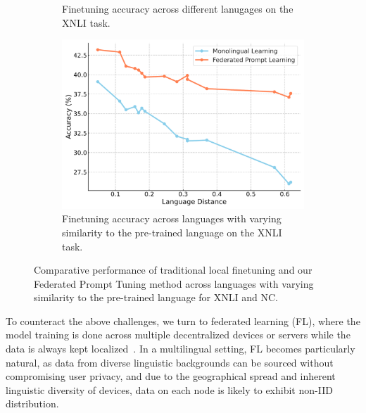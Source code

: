 \documentclass[withindex,glossary,firstyr]{cam-thesis}
\begin{document}
\begin{figure}[h]
\begin{subfigure}{0.49\textwidth}
        \vspace{-0.1cm}
        \caption{Finetuning accuracy across different lanugages on the XNLI task. }
    \end{subfigure}
    \hfill
    \begin{subfigure}{0.49\textwidth}
        \centering
        \includegraphics[width=0.8\linewidth]{xnli_distance.pdf}
        \vspace{-0.1cm}
        \caption{Finetuning accuracy across languages with varying similarity to the pre-trained language on the XNLI task. }
    \end{subfigure}
    \caption{Comparative performance of traditional local finetuning and our Federated Prompt Tuning method across languages with varying similarity to the pre-trained language for XNLI and NC. }
    \vspace{-0.5cm}%
    \label{fig:combined}
\end{figure}

To counteract the above challenges, we turn to federated learning (FL), where the model training is done across multiple decentralized devices or servers while the data is always kept localized~\cite{fedavg, fedprox, yang2019federated}. In a multilingual setting, FL becomes particularly natural, as data from diverse linguistic backgrounds can be sourced without compromising user privacy, and due to the geographical spread and inherent linguistic diversity of devices, data on each node is likely to exhibit non-IID distribution.
\end{document}
